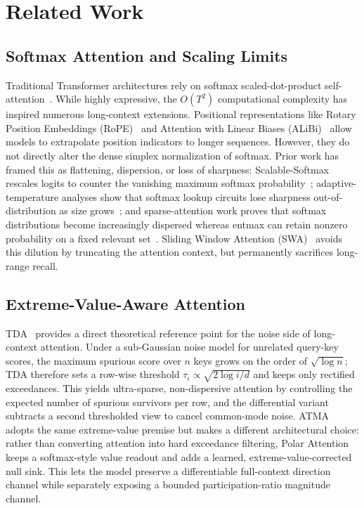 \documentclass{article} %
\begin{document}
\section{Related Work}

\subsection{Softmax Attention and Scaling Limits}
Traditional Transformer architectures rely on softmax scaled-dot-product self-attention~\citep{Vaswani+2017}. While highly expressive, the $O(T^2)$ computational complexity has inspired numerous long-context extensions. Positional representations like Rotary Position Embeddings (RoPE)~\citep{rope2021} and Attention with Linear Biases (ALiBi)~\citep{alibi2021} allow models to extrapolate position indicators to longer sequences. However, they do not directly alter the dense simplex normalization of softmax. Prior work has framed this as flattening, dispersion, or loss of sharpness: Scalable-Softmax rescales logits to counter the vanishing maximum softmax probability~\citep{nakanishi2025scalable}; adaptive-temperature analyses show that softmax lookup circuits lose sharpness out-of-distribution as size grows~\citep{velickovic2025softmax}; and sparse-attention work proves that softmax distributions become increasingly dispersed whereas entmax can retain nonzero probability on a fixed relevant set~\citep{vasylenko2026sparse}. Sliding Window Attention (SWA)~\citep{beltagy2020longformer} avoids this dilution by truncating the attention context, but permanently sacrifices long-range recall.

\subsection{Extreme-Value-Aware Attention}
TDA~\citep{huang2026threshold} provides a direct theoretical reference point for the noise side of long-context attention. Under a sub-Gaussian noise model for unrelated query-key scores, the maximum spurious score over $n$ keys grows on the order of $\sqrt{\log n}$; TDA therefore sets a row-wise threshold $\tau_i \propto \sqrt{2\log i / d}$ and keeps only rectified exceedances. This yields ultra-sparse, non-dispersive attention by controlling the expected number of spurious survivors per row, and the differential variant subtracts a second thresholded view to cancel common-mode noise. ATMA adopts the same extreme-value premise but makes a different architectural choice: rather than converting attention into hard exceedance filtering, Polar Attention keeps a softmax-style value readout and adds a learned, extreme-value-corrected null sink. This lets the model preserve a differentiable full-context direction channel while separately exposing a bounded participation-ratio magnitude channel.
\end{document}
